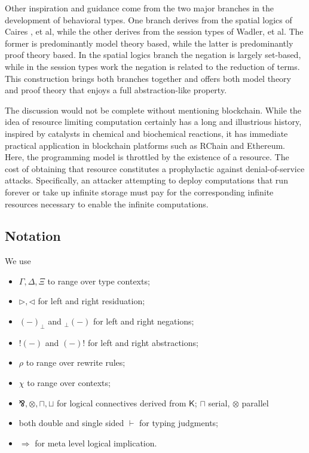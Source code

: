 \documentclass{llncs}
\renewcommand{\:}{\colon}
\begin{document}
Other inspiration and guidance come from the two major branches in the
development of behavioral types. One branch derives from the spatial
logics of Caires \cite{DBLP:conf/fossacs/Caires04}, et al, while the
other derives from the session types of Wadler, et
al. \cite{DBLP:journals/jfp/Wadler14} The former is predominantly
model theory based, while the latter is predominantly proof theory
based. In the spatial logics branch the negation is largely set-based,
while in the session types work the negation is related to the
reduction of terms. This construction brings both branches together
and offers both model theory and proof theory that enjoys a full
abstraction-like property.

The discussion would not be complete without mentioning
blockchain. While the idea of resource limiting computation certainly
has a long and illustrious history, inspired by catalysts in chemical
and biochemical reactions, it has immediate practical application in
blockchain platforms such as RChain and Ethereum. Here, the
programming model is throttled by the existence of a resource. The
cost of obtaining that resource constitutes a prophylactic against
denial-of-service attacks. Specifically, an attacker attempting to
deploy computations that run forever or take up infinite storage must
pay for the corresponding infinite resources necessary to enable the
infinite computations.

\subsection{Notation}
We use 

\begin{itemize}
  \item $\Gamma , \Delta , \Xi$  to range over type contexts;
  \item $\rhd , \lhd$ for left and right residuation;
  \item $(-)_{\perp}$ and $ _{\perp}(-)$  for left and right negations;
  \item $!(-)$ and $(-)!$  for left and right abstractions; 
  \item $\rho$ to range over rewrite rules;
  \item $\chi$ to range over contexts;
  \item $\bindnasrepma, \otimes, \sqcap, \sqcup$ for logical connectives derived from $\mathsf{K}$; $\sqcap$ serial, $\otimes$ parallel
  \item both double and single sided $\vdash$ for typing judgments;
  \item $\Rightarrow$ for meta level logical implication.
\end{itemize}
\end{document}
